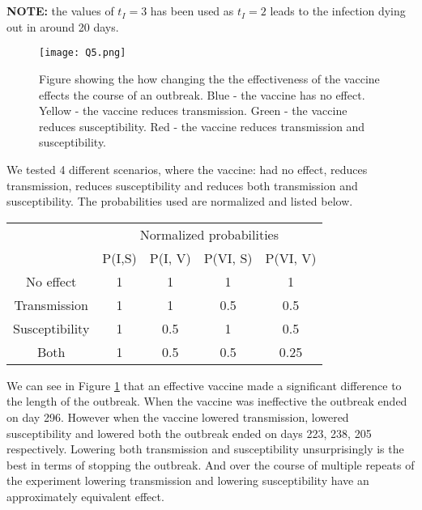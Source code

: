 \section{}
\textbf{NOTE: } the values of $t_I=3$ has been used as $t_I=2$ leads to the infection dying out in around 20 days.


\begin{figure}[h!]
    \begin{center}
        \texttt{[image: Q5.png]}
        \caption{Figure showing the how changing the the effectiveness of the vaccine effects the course of an outbreak. Blue - the vaccine has no effect. Yellow - the vaccine reduces transmission. Green - the vaccine reduces susceptibility. Red - the vaccine reduces transmission and susceptibility.} 
        \label{fig:q5}
    \end{center}
\end{figure}
We tested 4 different scenarios, where the vaccine: had no effect, reduces transmission, reduces susceptibility and reduces both transmission and susceptibility.
The probabilities used are normalized and listed below.
\begin{center}
\begin{tabular}{ccccc}
    &\multicolumn{4}{c}{Normalized probabilities}\\
    & P(I,S) & P(I, V) & P(VI, S) & P(VI, V)\\
    \hline
    No effect & 1 & 1& 1& 1 \\
    Transmission & 1 & 1& 0.5& 0.5 \\
    Susceptibility& 1 & 0.5& 1& 0.5 \\
    Both & 1 & 0.5 & 0.5 & 0.25 \\
\end{tabular}
\end{center}

We can see in Figure \ref{fig:q5} that an effective vaccine made a significant difference to the length of the outbreak.
When the vaccine was ineffective the outbreak ended on day 296.
However when the vaccine lowered transmission, lowered susceptibility and lowered both the outbreak ended on days 223, 238, 205 respectively.
Lowering both transmission and susceptibility unsurprisingly is the best in terms of stopping the outbreak.
And over the course of multiple repeats of the experiment lowering transmission and lowering susceptibility have an approximately equivalent effect.